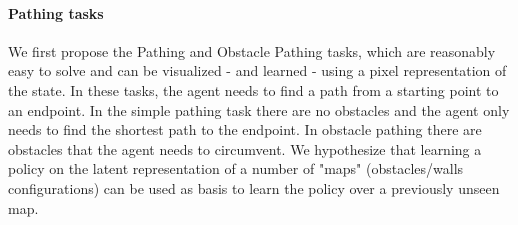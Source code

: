 
\paragraph{Pathing tasks}
We first propose the Pathing and Obstacle Pathing tasks, which are reasonably easy to solve and can be visualized - and learned - using a pixel representation of the state.
In these tasks, the agent needs to find a path from a starting point to an endpoint. 
In the simple pathing task there are no obstacles and the agent only needs to find the shortest path to the endpoint. 
In obstacle pathing there are obstacles that the agent needs to circumvent.
We hypothesize that learning a policy on the latent representation of a number of "maps" (obstacles/walls configurations) can be used as basis to learn the policy over a previously unseen map.


